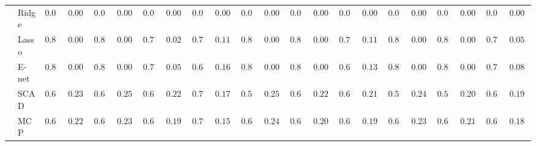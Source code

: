 \begin{tabular}{ll|ll|llllll|llllll|llllll}
 & Ridge  & $0.000$ & $0.0000$ & $0.000$ & $0.0000$ & $0.000$ & $0.0000$ & $0.000$ & $0.0000$ & $0.000$ & $0.0000$ & $0.000$ & $0.0000$ & $0.000$ & $0.0000$ & $0.000$ & $0.0000$ & $0.000$ & $0.0000$ & $0.000$ & $0.0000$ \\
 & Lasso  & $0.800$ & $0.0000$ & $0.800$ & $0.0000$ & $0.798$ & $0.0200$ & $0.730$ & $0.1150$ & $0.800$ & $0.0000$ & $0.800$ & $0.0000$ & $0.738$ & $0.1126$ & $0.800$ & $0.0000$ & $0.800$ & $0.0000$ & $0.782$ & $0.0575$ \\
 & E-net  & $0.800$ & $0.0000$ & $0.800$ & $0.0000$ & $0.790$ & $0.0522$ & $0.646$ & $0.1604$ & $0.800$ & $0.0000$ & $0.800$ & $0.0000$ & $0.682$ & $0.1366$ & $0.800$ & $0.0000$ & $0.800$ & $0.0000$ & $0.774$ & $0.0836$ \\
 & SCAD  & $0.610$ & $0.2385$ & $0.602$ & $0.2535$ & $0.628$ & $0.2292$ & $0.720$ & $0.1798$ & $0.582$ & $0.2576$ & $0.630$ & $0.2209$ & $0.682$ & $0.2185$ & $0.584$ & $0.2489$ & $0.572$ & $0.2089$ & $0.650$ & $0.1936$ \\
 & MCP  & $0.650$ & $0.2263$ & $0.640$ & $0.2327$ & $0.684$ & $0.1973$ & $0.716$ & $0.1587$ & $0.632$ & $0.2441$ & $0.678$ & $0.2008$ & $0.676$ & $0.1985$ & $0.632$ & $0.2339$ & $0.628$ & $0.2128$ & $0.666$ & $0.1821$ \\
\hline 
\end{tabular}

